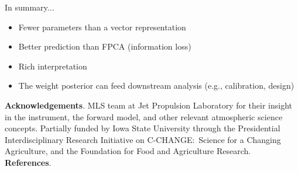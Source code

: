 \documentclass[final]{beamer}
\newlength{\sepwidth}
\newlength{\colwidth}
\newcommand{\separatorcolumn}{\begin{column}{\sepwidth}\end{column}}
\begin{document}
\begin{frame}[t]
{\begin{minipage}[t][76cm][t]{58cm}
\begin{minipage}[t]{1.0\linewidth}
\begin{minipage}[t]{.5\linewidth}
\begin{block}{In summary...}
            \begin{itemize}
            \item Fewer parameters than a vector representation
            \item Better prediction than FPCA (information loss)
            \item Rich interpretation
            \item The weight posterior can feed downstream analysis (e.g.,
              calibration, design)
            \end{itemize}
          \end{block}
        \end{minipage}
      \end{minipage}
    \end{minipage}%
  }
  \colorbox{black}{
    \begin{minipage}[t][76cm][t]{3cm}
    \end{minipage}%
  }

  \begin{minipage}[t][5cm][t]{116cm}
    \textbf{Acknowledgements}. MLS team at Jet Propulsion
    Laboratory for their insight in the instrument, the forward model, and other
    relevant atmospheric science concepts.
    Partially funded by Iowa State University through the
    Presidential Interdisciplinary Research Initiative on C-CHANGE:~Science
    for a Changing Agriculture, and the Foundation for Food and Agriculture
    Research.
    \textbf{References}.
    \printbibliography[heading=none]{}
  \end{minipage}

















\end{frame}
\end{document}
